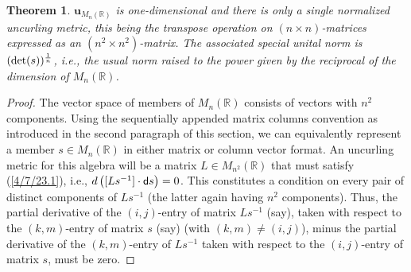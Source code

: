 \documentclass{amsart}
\numberwithin{equation}{section}
\newtheorem{theorem}{Theorem}
\theoremstyle{definition}
\numberwithin{theorem}{section}
\begin{document}
 
 \begin{theorem} \label{4/8/22.1} $\mathbf{u}_{M_n(\mathbb{R})}$ is one-dimensional and there is only a single normalized uncurling metric, this being the  transpose operation on $(n\times n)$-matrices expressed as an $(n^2\times n^2)$-matrix. The associated special unital norm is $({\rm det}(s))^{\frac{1}{n}}$, i.e., the usual norm raised to the power given by the reciprocal of the dimension of $M_n(\mathbb{R})$. \end{theorem}
 \begin{proof} The vector space of members of $ M_n(\mathbb{R})$ consists of  vectors with $n^2$ components.   Using the sequentially appended matrix columns convention as introduced in the second paragraph of this section, we can equivalently represent a member $s\in M_n(\mathbb{R})$ in either matrix or column vector format.   An uncurling metric for this algebra will be a matrix $L\in M_{n^2}(\mathbb{R})$ that must satisfy (\ref{4/7/23.1}), i.e., $d\left([Ls^{-1}]\cdot {\sf d}s\right)=0$. This constitutes a condition on every pair of distinct components of $Ls^{-1}$ (the latter again having $n^2$ components).  Thus,  the partial derivative of the  $(i,j)$-entry of matrix $Ls^{-1}$ (say), taken with respect to the $(k,m)$-entry of matrix $s$ (say) (with $(k,m)\ne (i,j)$),  minus  the partial derivative of the $(k,m)$-entry of $Ls^{-1}$  taken with respect to the $(i,j)$-entry of matrix $s$, must be zero.
 

\end{proof}
\end{document}
